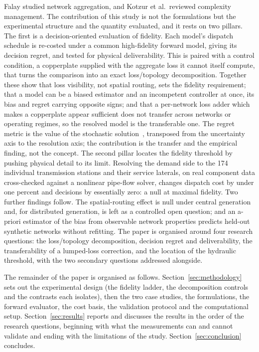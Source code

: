 \documentclass[a4paper,fleqn]{cas-sc}
\providecommand{\citep}[1]{\cite{#1}}
\begin{document}
Falay studied network aggregation, and Kotzur et al.\ reviewed complexity management. The
contribution of this study is not the formulations but the experimental structure and the
quantity evaluated, and it rests on two pillars. The first is a decision-oriented evaluation
of fidelity. Each model's dispatch schedule is re-costed under a common high-fidelity forward
model, giving its decision regret, and tested for physical deliverability. This is paired with
a control condition, a copperplate supplied with the aggregate loss it cannot itself compute,
that turns the comparison into an exact loss/topology decomposition. Together these show that
loss visibility, not spatial routing, sets the fidelity requirement; that a model can be a
biased estimator and an incompetent controller at once, its bias and regret carrying opposite
signs; and that a per-network loss adder which makes a copperplate appear sufficient does not
transfer across networks or operating regimes, so the resolved model is the transferable one.
The regret metric is the value of the stochastic solution~\citep{BirgeLouveaux2011}, transposed
from the uncertainty axis to the resolution axis; the contribution is the transfer and the
empirical finding, not the concept. The second pillar locates the fidelity threshold by pushing
physical detail to its limit. Resolving the demand side to the 174 individual transmission
stations and their service laterals, on real component data cross-checked against a nonlinear
pipe-flow solver, changes dispatch cost by under one percent and decisions by essentially zero:
a null at maximal fidelity. Two further findings follow. The spatial-routing effect is null
under central generation and, for distributed generation, is left as a controlled open
question; and an a-priori estimator of the bias from observable network properties predicts
held-out synthetic networks without refitting. The paper is organised around four research
questions: the loss/topology decomposition, decision regret and deliverability, the
transferability of a lumped-loss correction, and the location of the hydraulic threshold, with
the two secondary questions addressed alongside.

The remainder of the paper is organised as follows.
Section~\ref{sec:methodology} sets out the experimental design (the fidelity ladder, the
decomposition controls and the contrasts each isolates), then the two case studies, the
formulations, the forward evaluator, the cost basis, the validation protocol and the
computational setup. Section~\ref{sec:results} reports and discusses the results in the
order of the research questions, beginning with what the measurements can and cannot
validate and ending with the limitations of the study.
Section~\ref{sec:conclusion} concludes.
\end{document}
